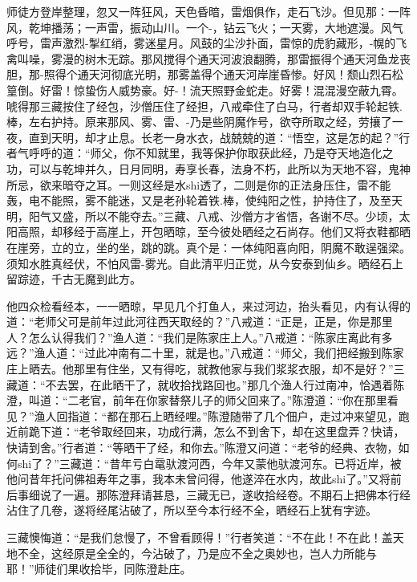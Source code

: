 \documentclass[12pt,UTF8]{ctexbook}
\begin{document}
{	师徒方登岸整理，忽又一阵狂风，天色昏暗，雷烟俱作，走石飞沙。但见那：一阵风，乾坤播荡；一声雷，振动山川。一个-，钻云飞火；一天雾，大地遮漫。风气呼号，雷声激烈-掣红绡，雾迷星月。风鼓的尘沙扑面，雷惊的虎豹藏形，-幌的飞禽叫噪，雾漫的树木无踪。那风搅得个通天河波浪翻腾，那雷振得个通天河鱼龙丧胆，那-照得个通天河彻底光明，那雾盖得个通天河岸崖昏惨。好风！颓山烈石松篁倒。好雷！惊蛰伤人威势豪。好-！流天照野金蛇走。好雾！混混漫空蔽九霄。唬得那三藏按住了经包，沙僧压住了经担，八戒牵住了白马，行者却双手轮起铁.棒，左右护持。原来那风、雾、雷、-乃是些阴魔作号，欲夺所取之经，劳攘了一夜，直到天明，却才止息。长老一身水衣，战兢兢的道：“悟空，这是怎的起？”行者气呼呼的道：“师父，你不知就里，我等保护你取获此经，乃是夺天地造化之功，可以与乾坤并久，日月同明，寿享长春，法身不朽，此所以为天地不容，鬼神所忌，欲来暗夺之耳。一则这经是水shi透了，二则是你的正法身压住，雷不能轰，电不能照，雾不能迷，又是老孙轮着铁.棒，使纯阳之性，护持住了，及至天明，阳气又盛，所以不能夺去。”三藏、八戒、沙僧方才省悟，各谢不尽。少顷，太阳高照，却移经于高崖上，开包晒晾，至今彼处晒经之石尚存。他们又将衣鞋都晒在崖旁，立的立，坐的坐，跳的跳。真个是：一体纯阳喜向阳，阴魔不敢逞强梁。须知水胜真经伏，不怕风雷-雾光。自此清平归正觉，从今安泰到仙乡。晒经石上留踪迹，千古无魔到此方。
	
	他四众检看经本，一一晒晾，早见几个打鱼人，来过河边，抬头看见，内有认得的道：“老师父可是前年过此河往西天取经的？”八戒道：“正是，正是，你是那里人？怎么认得我们？”渔人道：“我们是陈家庄上人。”八戒道：“陈家庄离此有多远？”渔人道：“过此冲南有二十里，就是也。”八戒道：“师父，我们把经搬到陈家庄上晒去。他那里有住坐，又有得吃，就教他家与我们浆浆衣服，却不是好？”三藏道：“不去罢，在此晒干了，就收拾找路回也。”那几个渔人行过南冲，恰遇着陈澄，叫道：“二老官，前年在你家替祭儿子的师父回来了。”陈澄道：“你在那里看见？”渔人回指道：“都在那石上晒经哩。”陈澄随带了几个佃户，走过冲来望见，跑近前跪下道：“老爷取经回来，功成行满，怎么不到舍下，却在这里盘弄？快请，快请到舍。”行者道：“等晒干了经，和你去。”陈澄又问道：“老爷的经典、衣物，如何shi了？”三藏道：“昔年亏白鼋驮渡河西，今年又蒙他驮渡河东。已将近岸，被他问昔年托问佛祖寿年之事，我本未曾问得，他遂淬在水内，故此shi了。”又将前后事细说了一遍。那陈澄拜请甚恳，三藏无已，遂收拾经卷。不期石上把佛本行经沾住了几卷，遂将经尾沾破了，所以至今本行经不全，晒经石上犹有字迹。
	
	三藏懊悔道：“是我们怠慢了，不曾看顾得！”行者笑道：“不在此！不在此！盖天地不全，这经原是全全的，今沾破了，乃是应不全之奥妙也，岂人力所能与耶！”师徒们果收拾毕，同陈澄赴庄。
	
}
\end{document}
